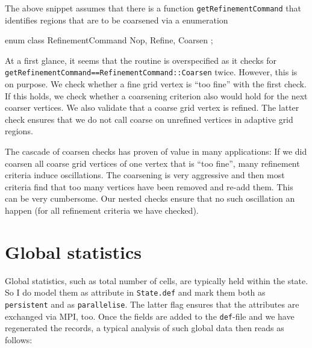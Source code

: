 \noindent
The above snippet assumes that there is a function \texttt{getRefinementCommand} that identifies
  regions that are to be coarsened via a enumeration
  \begin{code}
  enum class RefinementCommand {
    Nop, Refine, Coarsen
  };
  \end{code}
\noindent

At a first glance, it seems that the routine is overspecified as it checks for
\linebreak
\texttt{getRefinementCommand==RefinementCommand::Coarsen} twice. However, this
is on purpose. 
We check whether a fine grid vertex is ``too fine'' with the first check.
If this holds, we check whether a coarsening criterion also would hold for the
next coarser vertices.
We also validate that a coarse grid vertex is refined.
The latter check ensures that we do not call coarse on unrefined vertices in
adaptive grid regions.

The cascade of coarsen checks has proven of value in many applications: If we
did coarsen all coarse grid vertices of one vertex that is ``too fine'', many
refinement criteria induce oscillations.
The coarsening is very aggressive and then most criteria find that too many
vertices have been removed and re-add them.
This can be very cumbersome.
Our nested checks ensure that no such oscillation an happen (for all refinement
criteria we have checked).



\section{Global statistics}

Global statistics, such as total number of cells, are typically held within the
state. So I do model them as attribute in \texttt{State.def} and mark them both
as \texttt{persistent} and as \texttt{parallelise}. The latter flag ensures that
the attributes are exchanged via MPI, too. Once the fields are added to the
\texttt{def}-file and we have regenerated the records, a typical analysis of
such global data then reads as follows:

